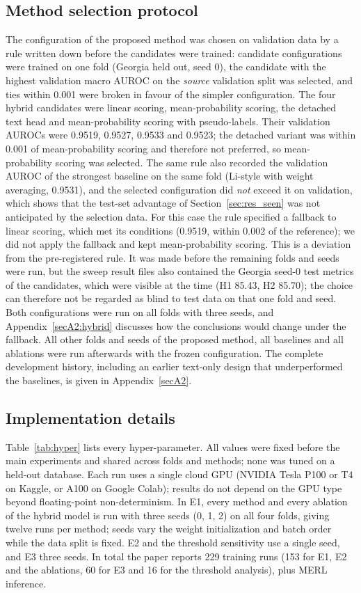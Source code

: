 \subsection{Method selection protocol}\label{sec:selection}
The configuration of the proposed method was chosen on validation data by a rule written down before the candidates were trained: candidate configurations were trained on one fold (Georgia held out, seed 0), the candidate with the highest validation macro AUROC on the \emph{source} validation split was selected, and ties within 0.001 were broken in favour of the simpler configuration. The four hybrid candidates were linear scoring, mean-probability scoring, the detached text head and mean-probability scoring with pseudo-labels. Their validation AUROCs were 0.9519, 0.9527, 0.9533 and 0.9523; the detached variant was within 0.001 of mean-probability scoring and therefore not preferred, so mean-probability scoring was selected. The same rule also recorded the validation AUROC of the strongest baseline on the same fold (Li-style with weight averaging, 0.9531), and the selected configuration did \emph{not} exceed it on validation, which shows that the test-set advantage of Section~\ref{sec:res_seen} was not anticipated by the selection data. For this case the rule specified a fallback to linear scoring, which met its conditions (0.9519, within 0.002 of the reference); we did not apply the fallback and kept mean-probability scoring. This is a deviation from the pre-registered rule. It was made before the remaining folds and seeds were run, but the sweep result files also contained the Georgia seed-0 test metrics of the candidates, which were visible at the time (H1 85.43, H2 85.70); the choice can therefore not be regarded as blind to test data on that one fold and seed. Both configurations were run on all folds with three seeds, and Appendix~\ref{secA2:hybrid} discusses how the conclusions would change under the fallback. All other folds and seeds of the proposed method, all baselines and all ablations were run afterwards with the frozen configuration. The complete development history, including an earlier text-only design that underperformed the baselines, is given in Appendix~\ref{secA2}.

\subsection{Implementation details}\label{sec:impl}
Table~\ref{tab:hyper} lists every hyper-parameter. All values were fixed before the main experiments and shared across folds and methods; none was tuned on a held-out database. Each run uses a single cloud GPU (NVIDIA Tesla P100 or T4 on Kaggle, or A100 on Google Colab); results do not depend on the GPU type beyond floating-point non-determinism. In E1, every method and every ablation of the hybrid model is run with three seeds (0, 1, 2) on all four folds, giving twelve runs per method; seeds vary the weight initialization and batch order while the data split is fixed. E2 and the threshold sensitivity use a single seed, and E3 three seeds. In total the paper reports 229 training runs (153 for E1, E2 and the ablations, 60 for E3 and 16 for the threshold analysis), plus MERL inference.

